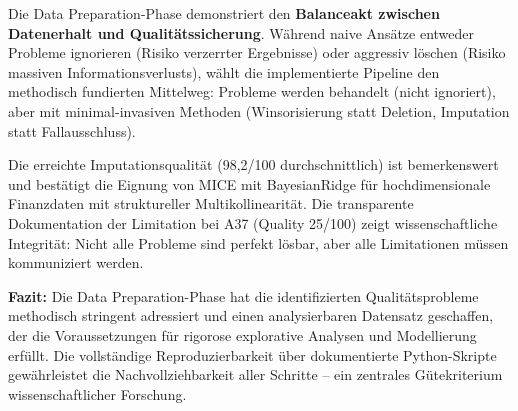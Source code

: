 Die Data Preparation-Phase demonstriert den \textbf{Balanceakt zwischen Datenerhalt und Qualitätssicherung}. Während naive Ansätze entweder Probleme ignorieren (Risiko verzerrter Ergebnisse) oder aggressiv löschen (Risiko massiven Informationsverlusts), wählt die implementierte Pipeline den methodisch fundierten Mittelweg: Probleme werden behandelt (nicht ignoriert), aber mit minimal-invasiven Methoden (Winsorisierung statt Deletion, Imputation statt Fallausschluss).

Die erreichte Imputationsqualität (98,2/100 durchschnittlich) ist bemerkenswert und bestätigt die Eignung von MICE mit BayesianRidge für hochdimensionale Finanzdaten mit struktureller Multikollinearität. Die transparente Dokumentation der Limitation bei A37 (Quality 25/100) zeigt wissenschaftliche Integrität: Nicht alle Probleme sind perfekt lösbar, aber alle Limitationen müssen kommuniziert werden.

\textbf{Fazit:} Die Data Preparation-Phase hat die identifizierten Qualitätsprobleme methodisch stringent adressiert und einen analysierbaren Datensatz geschaffen, der die Voraussetzungen für rigorose explorative Analysen und Modellierung erfüllt. Die vollständige Reproduzierbarkeit über dokumentierte Python-Skripte gewährleistet die Nachvollziehbarkeit aller Schritte – ein zentrales Gütekriterium wissenschaftlicher Forschung.
